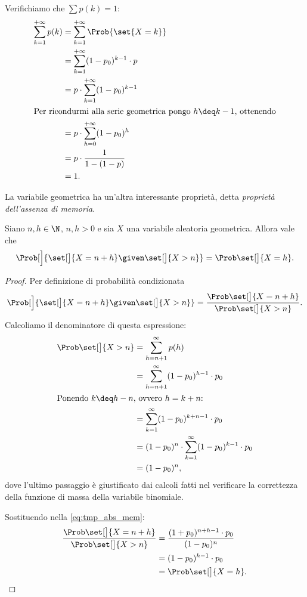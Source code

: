 Verifichiamo che $\sum p(k) = 1$:
\begin{align*}
    \sum_{k=1}^{+\infty} p(k) 
    &= \sum_{k=1}^{+\infty} \Prob{\set{X = k}}\\
    &= \sum_{k=1}^{+\infty} (1 - p_0)^{k-1} \cdot p\\
    &= p \cdot \sum_{k=1}^{+\infty} (1 - p_0)^{k-1}\\
    \intertext{Per ricondurmi alla serie geometrica pongo $h \deq k -1$, ottenendo}
    &= p \cdot \sum_{h=0}^{+\infty} (1 - p_0)^{h}\\
    &= p \cdot \frac{1}{1 - (1-p)}\\
    &= 1.
\end{align*}

La variabile geometrica ha un'altra interessante proprietà, detta \emph{proprietà dell'assenza di memoria}.
\begin{proposition}
    Siano $n, h \in \N$, $n, h > 0$ e sia $X$ una variabile aleatoria geometrica. Allora vale che \[
        \Prob[\Big]{\set[\big]{X = n + h} \given \set[\big]{X > n}} = \Prob\set[\big]{X = h}.    
    \]
\end{proposition}
\begin{proof}
    Per definizione di probabilità condizionata \begin{equation}
        \label{eq:tmp_abs_mem}
        \Prob[\Big]{\set[\big]{X = n + h} \given \set[\big]{X > n}}
        = \frac{\Prob\set[\big]{X = n + h}}{\Prob\set[\big]{X > n}}.
    \end{equation}
    Calcoliamo il denominatore di questa espressione: \begin{align*}
        \Prob\set[\big]{X > n}
        &= \sum_{h = n + 1}^\infty p(h)\\
        &= \sum_{h = n + 1}^\infty (1-p_0)^{h-1}\cdot p_0\\
        \intertext{Ponendo $k \deq h - n$, ovvero $h = k + n$:}
        &= \sum_{k = 1}^\infty (1-p_0)^{k+n-1} \cdot p_0\\
        &= (1 - p_0)^n \cdot \sum_{k = 1}^\infty (1-p_0)^{k-1}\cdot p_0\\
        &= (1 - p_0)^n,
    \end{align*}
    dove l'ultimo passaggio è giustificato dai calcoli fatti nel verificare la correttezza della funzione di massa della variabile binomiale.

    Sostituendo nella \eqref{eq:tmp_abs_mem}: \begin{align*}
        \frac{\Prob\set[\big]{X = n + h}}{\Prob\set[\big]{X > n}}
        &= \frac{(1+p_0)^{n+h-1} \cdot p_0}{(1-p_0)^n}\\
        &= (1-p_0)^{h-1}\cdot p_0\\
        &= \Prob\set[\big]{X = h}. \qedhere
    \end{align*}
\end{proof}

